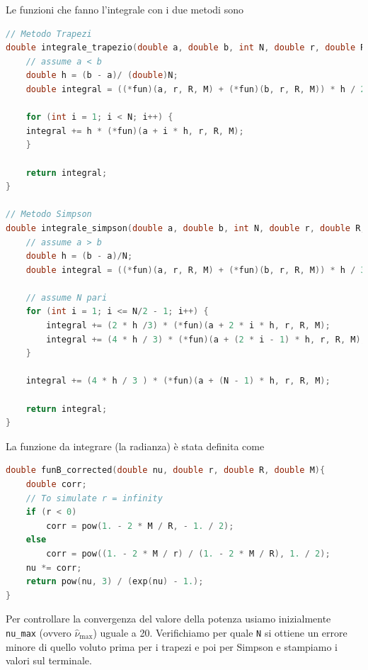 \documentclass[a4paper, titlepage]{article}
\begin{document}
Le funzioni che fanno l'integrale con i due metodi sono

\begin{lstlisting}[language=C]
// Metodo Trapezi
double integrale_trapezio(double a, double b, int N, double r, double R, double M, double (*fun)(double, double, double, double)){
    // assume a < b
    double h = (b - a)/ (double)N;
    double integral = ((*fun)(a, r, R, M) + (*fun)(b, r, R, M)) * h / 2;

    for (int i = 1; i < N; i++) {
    integral += h * (*fun)(a + i * h, r, R, M);
    }

    return integral;
}

// Metodo Simpson
double integrale_simpson(double a, double b, int N, double r, double R, double M, double (*fun)(double, double, double, double)){
    // assume a > b
    double h = (b - a)/N;
    double integral = ((*fun)(a, r, R, M) + (*fun)(b, r, R, M)) * h / 3;

    // assume N pari
    for (int i = 1; i <= N/2 - 1; i++) {
        integral += (2 * h /3) * (*fun)(a + 2 * i * h, r, R, M);
        integral += (4 * h / 3) * (*fun)(a + (2 * i - 1) * h, r, R, M);
    }

    integral += (4 * h / 3 ) * (*fun)(a + (N - 1) * h, r, R, M);

    return integral;
}
\end{lstlisting}

La funzione da integrare (la radianza) è stata definita come
\begin{lstlisting}[language=C]
double funB_corrected(double nu, double r, double R, double M){
    double corr;
    // To simulate r = infinity
    if (r < 0)
        corr = pow(1. - 2 * M / R, - 1. / 2);
    else
        corr = pow((1. - 2 * M / r) / (1. - 2 * M / R), 1. / 2);
    nu *= corr;
    return pow(nu, 3) / (exp(nu) - 1.);
}
\end{lstlisting}
Per controllare la convergenza del valore della potenza usiamo inizialmente \texttt{nu\_max} (ovvero $\hat \nu_\text{max}$) uguale a 20. Verifichiamo per quale \texttt{N} si ottiene un errore minore di quello voluto prima per i trapezi e poi per Simpson e stampiamo i valori sul terminale.
\end{document}
